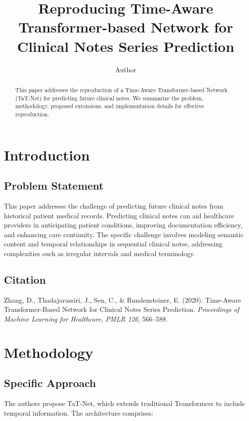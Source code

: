 \documentclass[twocolumn]{article}
\title{Reproducing Time-Aware Transformer-based Network for Clinical Notes Series Prediction}
\author{%
Author
}
\begin{document}
\maketitle

\begin{abstract}
This paper addresses the reproduction of a Time-Aware Transformer-based Network (TaT-Net) for predicting future clinical notes. We summarize the problem, methodology, proposed extensions, and implementation details for effective reproduction.
\end{abstract}

\section{Introduction}

\subsection{Problem Statement}

This paper addresses the challenge of predicting future clinical notes from historical patient medical records. Predicting clinical notes can aid healthcare providers in anticipating patient conditions, improving documentation efficiency, and enhancing care continuity. The specific challenge involves modeling semantic content and temporal relationships in sequential clinical notes, addressing complexities such as irregular intervals and medical terminology.

\subsection{Citation}

Zhang, D., Thadajarassiri, J., Sen, C., \& Rundensteiner, E. (2020). Time-Aware Transformer-Based Network for Clinical Notes Series Prediction. \textit{Proceedings of Machine Learning for Healthcare, PMLR 126}, 566–588.

\section{Methodology}

\subsection{Specific Approach}

The authors propose TaT-Net, which extends traditional Transformers to include temporal information. The architecture comprises:
\end{document}

